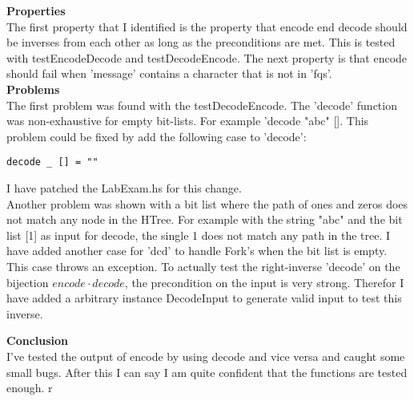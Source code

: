 \noindent
\textbf{Properties} \\
The first property that I identified is the property that encode end decode should be inverses from each other as long as the preconditions are met. This is tested with testEncodeDecode and testDecodeEncode.
The next property is that encode should fail when 'message' contains a character that is not in 'fqs'. \\

\noindent
\textbf{Problems} \\
The first problem was found with the testDecodeEncode. The 'decode' function was non-exhaustive for empty bit-lists. For example 'decode "abc" [].
This problem could be fixed by add the following case to 'decode': \\

\begin{lstlisting}
decode _ [] = ""
\end{lstlisting}

\noindent
I have patched the LabExam.hs for this change. \\

\noindent
Another problem was shown with a bit list where the path of ones and zeros does not match any node in the HTree.
For example with the string "abc" and the bit list [1] as input for decode, the single 1 does not match any path in the tree.
I have added another case for 'dcd' to handle Fork's when the bit list is empty. This case throws an exception.
To actually test the right-inverse 'decode' on the bijection $encode \cdot decode$, the precondition on the input is very strong.
Therefor I have added a arbitrary instance DecodeInput to generate valid input to test this inverse.

\noindent
\textbf{Conclusion} \\
I've tested the output of encode by using decode and vice versa and caught some small bugs. After this I can say I am quite confident that the functions are tested enough.
r

